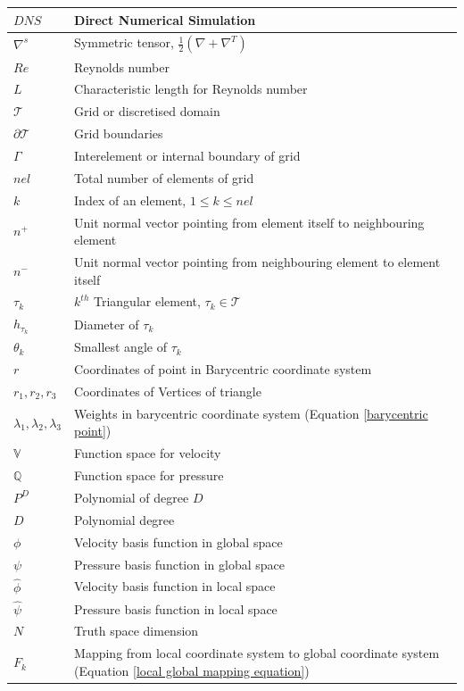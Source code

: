 \documentclass[a4paper,openany]{book}
\begin{document}
\begin{longtable}{| p{} | p{} |}
\hline
$DNS$ & Direct Numerical Simulation\\
\hline
$\nabla^s$ & Symmetric tensor, $\frac{1}{2} (\nabla + \nabla^T)$\\
\hline
$Re$ & Reynolds number\\
\hline
$L$ & Characteristic length for Reynolds number\\
\hline
$\mathcal{T}$ & Grid or discretised domain\\
\hline
$\partial \mathcal{T}$ & Grid boundaries\\
\hline
$\Gamma$ & Interelement or internal boundary of grid\\
\hline
$nel$ & Total number of elements of grid\\
\hline
$k$ & Index of an element, $1\leq k \leq nel$\\
\hline
$n^+$ & Unit normal vector pointing from element itself to neighbouring element\\
\hline
$n^-$ & Unit normal vector pointing from neighbouring element to element itself \\
\hline
$\tau_k$ & $k^{th}$ Triangular element, $\tau_k \in \mathcal{T}$\\
\hline
$h_{\tau_k}$ & Diameter of $\tau_k$\\
\hline
$\theta_k$ & Smallest angle of $\tau_k$\\ 
\hline
$r$ & Coordinates of point in Barycentric coordinate system\\
\hline
$r_1, r_2, r_3$ & Coordinates of Vertices of triangle\\
\hline
$\lambda_1, \lambda_2, \lambda_3$ & Weights in barycentric coordinate system (Equation \ref{barycentric point})\\
\hline
$\mathbb{V}$ & Function space for velocity\\
\hline
$\mathbb{Q}$ & Function space for pressure\\
\hline
$P^D$ & Polynomial of degree $D$\\
\hline
$D$ & Polynomial degree\\
\hline
$\phi$ & Velocity basis function in global space\\
\hline
$\psi$ & Pressure basis function in global space\\
\hline
$\hat{\phi}$ & Velocity basis function in local space\\
\hline
$\hat{\psi}$ & Pressure basis function in local space\\
\hline
$N$ & Truth space dimension\\
\hline
$F_k$ & Mapping from local coordinate system to global coordinate system (Equation \ref{local global mapping equation})\\

\end{longtable}
\end{document}
